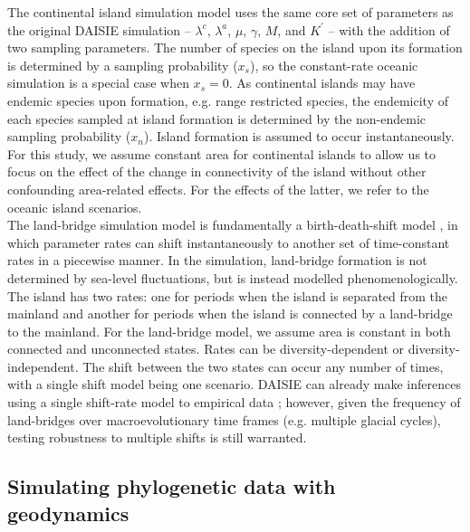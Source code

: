 \documentclass{article}
\begin{document}
The continental island simulation model uses the same core set of parameters as the original DAISIE simulation -- $\lambda^c$, $\lambda^a$, $\mu$, $\gamma$, $M$, and $K^\prime$ -- with the addition of two sampling parameters. The number of species on the island upon its formation is determined by a sampling probability ($x_s$), so the constant-rate oceanic simulation is a special case when $x_s = 0$. As continental islands may have endemic species upon formation, e.g. range restricted species, the endemicity of each species sampled at island formation is determined by the non-endemic sampling probability ($x_n$). Island formation is assumed to occur instantaneously. For this study, we assume constant area for continental islands to allow us to focus on the effect of the change in connectivity of the island without other confounding area-related effects. For the effects of the latter, we refer to the oceanic island scenarios. \\

The land-bridge simulation model is fundamentally a birth-death-shift model \citep{rabosky_likelihood_2006, stadler_mammalian_2011, hohna_tess_2016}, in which parameter rates can shift instantaneously to another set of time-constant rates in a piecewise manner. In the simulation, land-bridge formation is not determined by sea-level fluctuations, but is instead modelled phenomenologically. The island has two rates: one for periods when the island is separated from the mainland and another for periods when the island is connected by a land-bridge to the mainland. For the land-bridge model, we assume area is constant in both connected and unconnected states. Rates can be diversity-dependent or diversity-independent. The shift between the two states can occur any number of times, with a single shift model \citep{valente_deep_2019, hauffe_lake_2020} being one scenario. DAISIE can already make inferences using a single shift-rate model to empirical data \citep{valente_deep_2019, hauffe_lake_2020}; however, given the frequency of land-bridges over macroevolutionary time frames (e.g. multiple glacial cycles), testing robustness to multiple shifts is still warranted. 

\subsection*{Simulating phylogenetic data with geodynamics}
\end{document}
